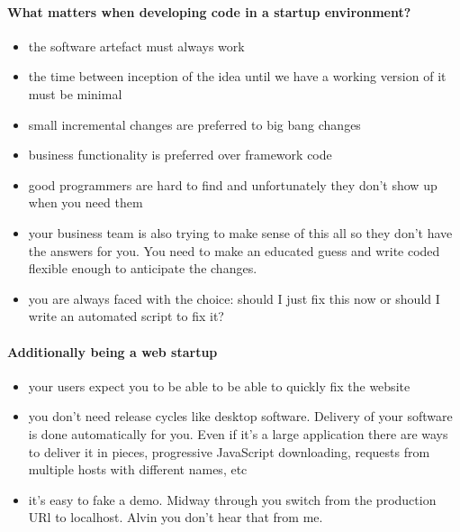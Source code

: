 \documentclass{article}
\begin{document}
\paragraph{What matters when developing code in a startup
  environment?}
\begin{itemize}
\item the software artefact must always work

\item the time between inception of the idea until we have a working
  version of it must be minimal

\item small incremental changes are preferred to big bang changes

\item business functionality is preferred over framework code

\item good programmers are hard to find and unfortunately they don't
  show up when you need them

\item your business team is also trying to make sense of this all so
  they don't have the answers for you. You need to make an educated
  guess and write coded flexible enough to anticipate the changes.

\item  you are always faced with the choice: should I just fix this
  now or should I write an automated script to fix it?
\end{itemize}


\paragraph{Additionally being a web startup}
\begin{itemize}
\item  your users expect you to be able to be able to quickly fix the
website

\item  you don't need release cycles like desktop software. Delivery
  of your software is done automatically for you. Even if it's a
  large application there are ways to deliver it in pieces,
  progressive JavaScript downloading, requests from multiple
  hosts with different names, etc

\item  it's easy to fake a demo. Midway through you switch from the
  production URl to localhost. Alvin you don't hear that from me.
\end{itemize}
\end{document}
